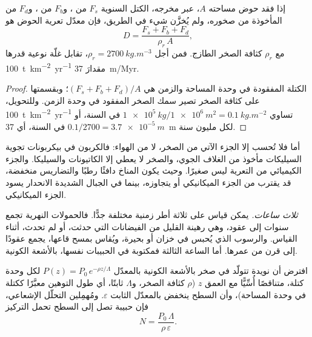 \begin{proposition}\label{prop:b1:erosion-transport:denudation}
إذا فقد حوض مساحته $A$، عبر مخرجه، الكتل السنوية $F_s$ من ، و$F_b$ من ، و$F_d$ من  المأخوذة من صخوره، ولم يُخزَّن شيء في الطريق، فإن معدّل تعرية الحوض هو
\[
  D = \frac{F_s + F_b + F_d}{\rho_r\,A},
\]
مع $\rho_r$ كثافة الصخر الطازج. فمن أجل $\rho_r =
\qty{2700}{kg.m^{-3}}$، تقابل غلّة نوعية قدرها \qty{100}{t.km^{-2}.yr^{-1}}
مقدارَ \qty{37}{m/Myr}.
\end{proposition}

\begin{proof}
الكتلة المفقودة في وحدة المساحة والزمن هي $(F_s + F_b + F_d)/A$؛ وبقسمتها على كثافة الصخر تصير سمك الصخر المفقود في وحدة الزمن. وللتحويل، \qty{100}{t.km^{-2}.yr^{-1}} تساوي
$\qty{1e5}{kg}/\qty{1e6}{m^2} = \qty{0.1}{kg.m^{-2}}$ في السنة، أو
$0.1/2700 = \qty{3.7e-5}{m}$ في السنة، أي \qty{37}{m} لكل مليون سنة.
\end{proof}

أما  فلا تُحسب إلا الجزء الآتي من الصخر، لا من الهواء: فالكربون في بيكربونات تجوية السيليكات مأخوذ من الغلاف الجوي، والصخر لا يعطي إلا الكاتيونات والسيليكا. والجزء الكيميائي من التعرية ليس صغيرًا. وحيث يكون المناخ دافئًا رطبًا والتضاريس منخفضة، قد يقترب من الجزء الميكانيكي أو يتجاوزه، بينما في الجبال الشديدة الانحدار يسود الجزء الميكانيكي.

\emph{ثلاث ساعات.} يمكن قياس  على ثلاثة أطر زمنية مختلفة جدًّا. فالحمولات النهرية تجمع سنوات إلى عقود، وهي رهينة القليل من الفيضانات التي حدثت، أو لم تحدث، أثناء القياس. والرسوب الذي يُحبس في خزان أو بحيرة، ويُقاس بمسح قاعها، يجمع عقودًا إلى قرن من عمرها. أما الساعة الثالثة فمكتوبة في الحبيبات نفسها، بالأشعة الكونية.

\begin{proposition}\label{prop:b1:erosion-transport:cosmogenic}
افترض أن نويدة تتولّد في صخر بالأشعة الكونية بالمعدّل
$P(z) = P_0\,e^{-\rho z/\Lambda}$ لكل وحدة كتلة، متناقصًا أُسِّيًّا مع العمق $z$ ($\rho$ كثافة الصخر، و$\Lambda$ ثابتًا، أي طول التوهين معبَّرًا ككتلة في وحدة المساحة)، وأن السطح ينخفض بالمعدّل الثابت $\varepsilon$. ومُهمِلين التحلّل الإشعاعي، فإن حبيبة تصل إلى السطح تحمل التركيز
\[
  N = \frac{P_0\,\Lambda}{\rho\,\varepsilon}.
\]
\end{proposition}

